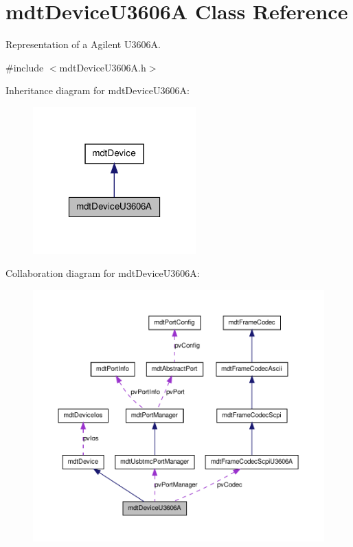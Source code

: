 \hypertarget{classmdt_device_u3606_a}{
\section{mdtDeviceU3606A Class Reference}
\label{classmdt_device_u3606_a}
}


Representation of a Agilent U3606A.  




{\ttfamily \#include $<$mdtDeviceU3606A.h$>$}



Inheritance diagram for mdtDeviceU3606A:\nopagebreak
\begin{figure}[H]
\begin{center}
\leavevmode
\includegraphics[width=178pt]{classmdt_device_u3606_a__inherit__graph}
\end{center}
\end{figure}


Collaboration diagram for mdtDeviceU3606A:\nopagebreak
\begin{figure}[H]
\begin{center}
\leavevmode
\includegraphics[width=400pt]{classmdt_device_u3606_a__coll__graph}
\end{center}
\end{figure}
